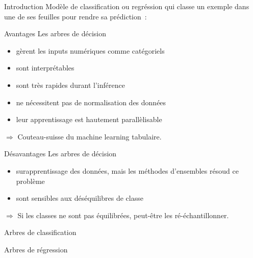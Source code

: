 \begin{frame}{Introduction}
  Modèle de classification ou regréssion qui classe un exemple dans une de ses feuilles pour rendre sa prédiction~:
\end{frame}

\begin{frame}{Avantages}
  Les arbres de décision

  \begin{itemize}
    \item gèrent les inputs numériques comme catégoriels
    \item sont interprétables
    \item sont très rapides durant l'inférence
    \item ne nécessitent pas de normalisation des données
    \item leur apprentissage est hautement parallèlisable
  \end{itemize}

  $\Rightarrow$ Couteau-suisse du machine learning tabulaire.
\end{frame}

\begin{frame}{Désavantages}
  Les arbres de décision

  \begin{itemize}
    \item surapprentissage des données, mais les méthodes d'ensembles résoud ce problème
    \item sont sensibles aux déséquilibres de classe
  \end{itemize}
  $\Rightarrow$ Si les classes ne sont pas équilibrées, peut-être les ré-échantillonner.
\end{frame}

\begin{frame}{Arbres de classification}
\end{frame}

\begin{frame}{Arbres de régression}
\end{frame}

